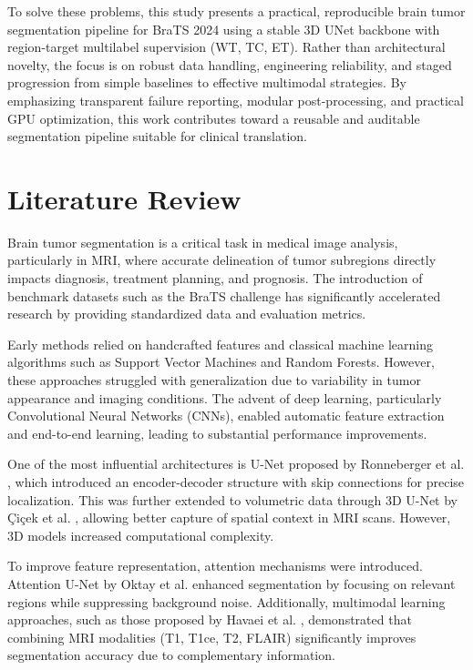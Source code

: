 \documentclass[conference]{IEEEtran}
\begin{document}
To solve these problems, this study presents a practical, reproducible brain tumor segmentation pipeline for BraTS 2024 using a stable 3D UNet backbone with region-target multilabel supervision (WT, TC, ET). Rather than architectural novelty, the focus is on robust data handling, engineering reliability, and staged progression from simple baselines to effective multimodal strategies. By emphasizing transparent failure reporting, modular post-processing, and practical GPU optimization, this work contributes toward a reusable and auditable segmentation pipeline suitable for clinical translation.

\section{Literature Review}

Brain tumor segmentation is a critical task in medical image analysis, particularly in MRI, where accurate delineation of tumor subregions directly impacts diagnosis, treatment planning, and prognosis. The introduction of benchmark datasets such as the BraTS challenge has significantly accelerated research by providing standardized data and evaluation metrics.

Early methods relied on handcrafted features and classical machine learning algorithms such as Support Vector Machines and Random Forests. However, these approaches struggled with generalization due to variability in tumor appearance and imaging conditions. The advent of deep learning, particularly Convolutional Neural Networks (CNNs), enabled automatic feature extraction and end-to-end learning, leading to substantial performance improvements.

One of the most influential architectures is U-Net proposed by Ronneberger et al. \cite{1}, which introduced an encoder-decoder structure with skip connections for precise localization. This was further extended to volumetric data through 3D U-Net by Çiçek et al. \cite{2}, allowing better capture of spatial context in MRI scans. However, 3D models increased computational complexity.

To improve feature representation, attention mechanisms were introduced. Attention U-Net by Oktay et al. \cite{3} enhanced segmentation by focusing on relevant regions while suppressing background noise. Additionally, multimodal learning approaches, such as those proposed by Havaei et al. \cite{4}, demonstrated that combining MRI modalities (T1, T1ce, T2, FLAIR) significantly improves segmentation accuracy due to complementary information.
\end{document}
